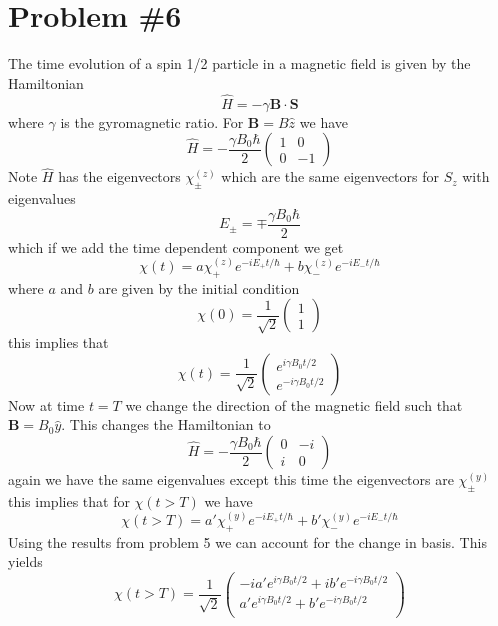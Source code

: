 \documentclass[11pt]{article}
\numberwithin{equation}{section}
\begin{document}
\section{Problem \#6}
The time evolution of a spin 1/2 particle in a magnetic field is given by the Hamiltonian 
$$\hat{H} = -\gamma \mathbf{B}\cdot\mathbf{S}$$
where $\gamma$ is the gyromagnetic ratio. For $\mathbf{B} = B\hat{z}$ we have
$$\hat{H} = -\frac{\gamma B_0\hbar}{2}\left(\begin{array}{cc}
                                            1    &0 \\
                                            0    &-1
                                      \end{array}\right)$$
Note $\hat{H}$ has the eigenvectors $\chi^{(z)}_{\pm}$ which are the same eigenvectors for $S_z$ with eigenvalues 
$$E_{\pm} = \mp\frac{\gamma B_0 \hbar}{2}$$
which if we add the time dependent component we get
$$\chi(t) = a\chi^{(z)}_{+}e^{-iE_+t/\hbar} + b\chi^{(z)}_{-}e^{-iE_-t/\hbar}$$ 
where $a$ and $b$ are given by the initial condition 
$$\chi(0) = \frac{1}{\sqrt{2}}\left(\begin{array}{c}
                                    1\\ 1
                               \end{array}\right)$$
this implies that
$$\chi(t) = \frac{1}{\sqrt{2}}\left(\begin{array}{c}
                                    e^{i\gamma B_0t/2}\\ 
                                    e^{-i\gamma B_0t/2}
                               \end{array}\right)$$
Now at time $t=T$ we change the direction of the magnetic field such that $\mathbf{B} = B_0\hat{y}$. This changes the Hamiltonian to
$$\hat{H} = -\frac{\gamma B_0\hbar}{2}\left(\begin{array}{cc}
                                            0    &-i\\
                                            i    &0 
                                      \end{array}\right)$$
again we have the same eigenvalues except this time the eigenvectors are $\chi^{(y)}_{\pm}$ this implies that for $\chi(t>T)$ we have
$$\chi(t>T) = a'\chi^{(y)}_{+}e^{-iE_+t/\hbar} + b'\chi^{(y)}_{-}e^{-iE_-t/\hbar}$$ 
Using the results from problem 5 we can account for the change in basis. This yields
$$\chi(t>T) = \frac{1}{\sqrt{2}}\left(\begin{array}{c}
                       -ia'e^{i\gamma B_0t/2} + ib'e^{-i\gamma B_0t/2}\\
                       a'e^{i\gamma B_0t/2} + b'e^{-i\gamma B_0t/2}\\
                                \end{array}\right)$$
\end{document}
